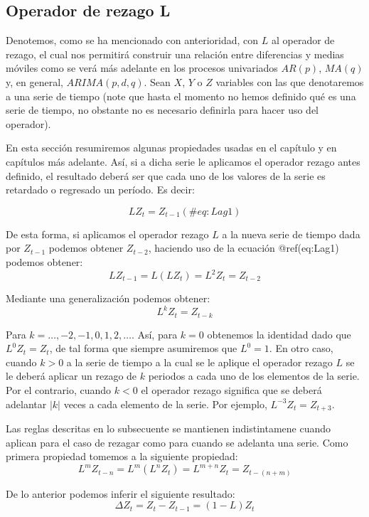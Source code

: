 \documentclass[
  a4paper,
]{article}
\begin{document}
\hypertarget{operador-de-rezago-l}{%
\subsection{Operador de rezago L}\label{operador-de-rezago-l}}

Denotemos, como se ha mencionado con anterioridad, con \(L\) al operador
de rezago, el cual nos permitirá construir una relación entre
diferencias y medias móviles como se verá más adelante en los procesos
univariados \(AR(p)\), \(MA(q)\) y, en general, \(ARIMA(p, d, q)\). Sean
\(X\), \(Y\) o \(Z\) variables con las que denotaremos a una serie de
tiempo (note que hasta el momento no hemos definido qué es una serie de
tiempo, no obstante no es necesario definirla para hacer uso del
operador).

En esta sección resumiremos algunas propiedades usadas en el capítulo y
en capítulos más adelante. Así, si a dicha serie le aplicamos el
operador rezago antes definido, el resultado deberá ser que cada uno de
los valores de la serie es retardado o regresado un período. Es decir:

\[
    L Z_t = Z_{t-1}
    (\#eq:Lag1)
\]

De esta forma, si aplicamos el operador rezago \(L\) a la nueva serie de
tiempo dada por \(Z_{t-1}\) podemos obtener \(Z_{t-2}\), haciendo uso de
la ecuación @ref(eq:Lag1) podemos obtener: \[
    L Z_{t-1} = L(L Z_t) = L^2 Z_t = Z_{t-2}
\]

Mediante una generalización podemos obtener: \[
    L^k Z_t = Z_{t-k}
\]

Para \(k = \ldots, -2, -1, 0, 1, 2, \ldots\). Así, para \(k = 0\)
obtenemos la identidad dado que \(L^0 Z_t = Z_t\), de tal forma que
siempre asumiremos que \(L^0 = 1\). En otro caso, cuando \(k > 0\) a la
serie de tiempo a la cual se le aplique el operador rezago \(L\) se le
deberá aplicar un rezago de \(k\) periodos a cada uno de los elementos
de la serie. Por el contrario, cuando \(k < 0\) el operador rezago
significa que se deberá adelantar \(|k|\) veces a cada elemento de la
serie. Por ejemplo, \(L^{-3} Z_t = Z_{t+3}\).

Las reglas descritas en lo subsecuente se mantienen indistintamene
cuando aplican para el caso de rezagar como para cuando se adelanta una
serie. Como primera propiedad tomemos a la siguiente propiedad: \[
    L^{m} Z_{t-n} = L^{m} (L^{n} Z_{t}) = L^{m + n} Z_{t} = Z_{t-(n + m)} 
\]

De lo anterior podemos inferir el siguiente resultado: \[
    \Delta Z_{t} = Z_{t} - Z_{t-1} = (1 - L) Z_{t} 
\]
\end{document}
